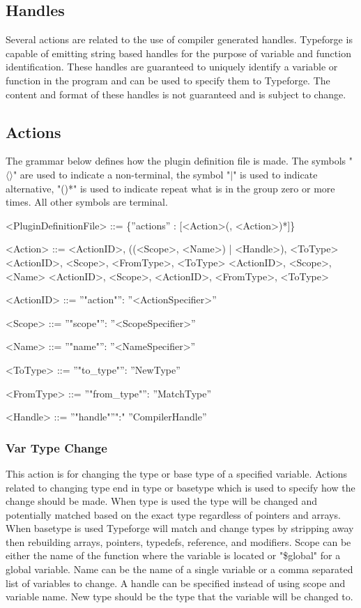 \documentclass[natbib]{article}
\begin{document}
\subsection{Handles} \label{sec:handles}
Several actions are related to the use of compiler generated handles. Typeforge is capable of emitting string 
based handles for the purpose of variable and function identification. These handles are guaranteed to 
uniquely identify a variable or function in the program and can be used to specify them to Typeforge. 
The content and format of these handles is not guaranteed and is 
subject to change.

\subsection{Actions}
The grammar below defines how the plugin definition file is made.
The symbols "$\langle\rangle$" are used to indicate a non-terminal, the symbol "$\mid$" is used to 
indicate alternative, "()*" is used to indicate repeat what is in the group zero or more times. 
All other symbols are terminal. 

\begin{grammar}
<PluginDefinitionFile> ::= \{''actions'' : [<Action>(, <Action>)*]\}

<Action>                 ::= <ActionID>, ((<Scope>, <Name>) | <Handle>), <ToType>
\alt <ActionID>, <Scope>, <FromType>, <ToType>
\alt <ActionID>, <Scope>, <Name>
\alt <ActionID>, <Scope>,
\alt <ActionID>, <FromType>, <ToType>

<ActionID> ::= ''"action"'': ''<ActionSpecifier>''

<Scope> ::= ''"scope"'': ''<ScopeSpecifier>''

<Name> ::= ''"name"'': ''<NameSpecifier>''

<ToType> ::= ''"to_type"'': ''NewType''

<FromType> ::= ''"from_type"'': ''MatchType''

<Handle> ::= ''"handle"''":" ''CompilerHandle''
\end{grammar}

\subsubsection{Var Type Change} \label{sec:vartypechange}
This action is for changing the type or base type of a specified variable. Actions related to 
changing type end in type or basetype which is used to specify how the change should be made. 
When type is used the type will be changed and potentially matched based on the exact type 
regardless of pointers and arrays. When basetype is used Typeforge will match and change types 
by stripping away then rebuilding arrays, pointers, typedefs, reference, and modifiers. 
Scope can be either the name of the function where the variable is located or "\$global" 
for a global variable. Name can be the name of a single variable or a comma separated 
list of variables to change. A handle can be specified instead of using scope and variable name. New type 
should be the type that the variable will be changed to.
\end{document}

